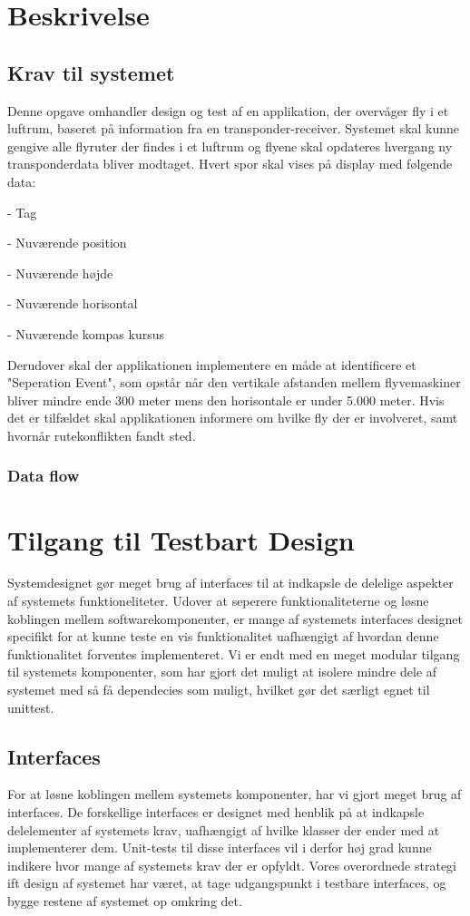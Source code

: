 \section{Beskrivelse}
\subsection{Krav til systemet}
Denne opgave omhandler design og test af en applikation, der overvåger fly i et luftrum, baseret på information fra en transponder-receiver. 
Systemet skal kunne gengive alle flyruter der findes i et luftrum og flyene skal opdateres hvergang ny transponderdata bliver modtaget. Hvert spor skal vises på display med følgende data: 

- Tag

- Nuværende position

- Nuværende højde

- Nuværende horisontal

- Nuværende kompas kursus

Derudover skal der applikationen implementere en måde at identificere et "Seperation Event", som opstår når den vertikale afstanden mellem flyvemaskiner bliver mindre ende 300 meter mens den horisontale er under 5.000 meter. 
Hvis det er tilfældet skal applikationen informere om hvilke fly der er involveret, samt hvornår rutekonflikten fandt sted.

\subsubsection{Data flow}




\newpage
\section{Tilgang til Testbart Design}

Systemdesignet gør meget brug af interfaces til at indkapsle de delelige aspekter af systemets funktioneliteter. 
Udover at seperere funktionaliteterne og løsne koblingen mellem softwarekomponenter, er mange af systemets interfaces designet specifikt for at kunne teste en vis funktionalitet uafhængigt af hvordan denne funktionalitet forventes implementeret.
Vi er endt med en meget modular tilgang til systemets komponenter, som har gjort det muligt at isolere mindre dele af systemet med så få dependecies som muligt, hvilket gør det særligt egnet til unittest.

\subsection{Interfaces}
For at løsne koblingen mellem systemets komponenter, har vi gjort meget brug af interfaces. 
De forskellige interfaces er designet med henblik på at indkapsle delelementer af systemets krav, uafhængigt af hvilke klasser der ender med at implementerer dem.
Unit-tests til disse interfaces vil i derfor høj grad kunne indikere hvor mange af systemets krav der er opfyldt. Vores overordnede strategi ift design af systemet har været, at tage udgangspunkt i testbare interfaces, og bygge restene af systemet op omkring det.
